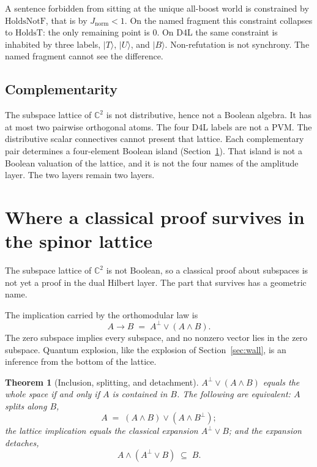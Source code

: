 \documentclass[a4paper]{article}
\newtheorem{theorem}{Theorem}[section]
\theoremstyle{definition}
\newcommand{\Jnorm}{J_{\mathrm{norm}}}
\begin{document}
A sentence forbidden from sitting at the unique all-boost world is
constrained by \(\mathrm{HoldsNotF}\), that is by \(\Jnorm<1\). On the
named fragment this constraint collapses to \(\mathrm{HoldsT}\): the
only remaining point is \(0\). On D4L the same constraint is inhabited
by three labels, \(\lvert T\rangle\), \(\lvert U\rangle\), and
\(\lvert B\rangle\). Non-refutation is not synchrony. The named
fragment cannot see the difference.

\subsection{Complementarity}
\label{sec:ex-comp}

The subspace lattice of \(\mathbb{C}^2\) is not distributive, hence not
a Boolean algebra. It has at most two pairwise orthogonal atoms. The
four D4L labels are not a PVM. The distributive scalar connectives
cannot present that lattice. Each complementary pair determines a
four-element Boolean island (Section~\ref{sec:block}). That island is
not a Boolean valuation of the lattice, and it is not the four names
of the amplitude layer. The two layers remain two
layers.

\section{Where a classical proof survives in the spinor lattice}
\label{sec:block}

The subspace lattice of \(\mathbb{C}^2\) is not Boolean, so a classical
proof about subspaces is not yet a proof in the dual Hilbert layer. The
part that survives has a geometric name.

The implication carried by the orthomodular law is
\[
A\to B \;=\; A^\perp\vee(A\wedge B).
\]
The zero subspace implies every subspace, and no nonzero vector lies in
the zero subspace. Quantum explosion, like the explosion of
Section~\ref{sec:wall}, is an inference from the bottom of the lattice.

\begin{theorem}[Inclusion, splitting, and detachment]
\label{thm:split}
\(A^\perp\vee(A\wedge B)\) equals the whole space if and only if \(A\) is
contained in \(B\). The following are equivalent: \(A\) splits along
\(B\),
\[
A \;=\; (A\wedge B)\vee(A\wedge B^\perp);
\]
the lattice implication equals the classical expansion \(A^\perp\vee B\);
and the expansion detaches,
\[
A\wedge(A^\perp\vee B)\;\subseteq\; B.
\]
\end{theorem}
\end{document}
